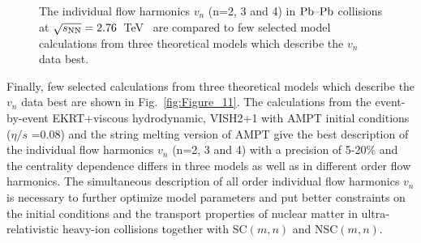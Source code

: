 \begin{figure}[h]
\begin{center}
        \caption{The individual flow harmonics $v_n$ (n=2, 3 and 4) in $\textnormal{Pb--Pb}$ collisions at $\sqrt{s_{\textnormal{NN}}}=2.76$~TeV~\cite{Adam:2016izf} are compared to few selected model calculations from three theoretical models which describe the $v_n$ data best.}
        \label{fig:Figure_A4}
              \end{center}
\end{figure}

Finally, few selected calculations from three theoretical models which describe the $v_n$ data best are shown in Fig.~\ref{fig:Figure_11}.
The calculations from the event-by-event EKRT+viscous hydrodynamic, VISH2+1 with AMPT initial conditions ($\eta/s$ =0.08) and the string melting version of AMPT give the best description of the individual flow harmonics $v_n$ (n=2, 3 and 4) with a precision of 5-20\% and the centrality dependence differs in three models as well as in different order flow harmonics.
The simultaneous description of all order individual flow harmonics $v_n$ is necessary to further optimize model parameters and put better constraints on the initial conditions and the transport properties of nuclear matter in ultra-relativistic heavy-ion collisions together with SC$(m,n)$ and NSC$(m,n)$.

